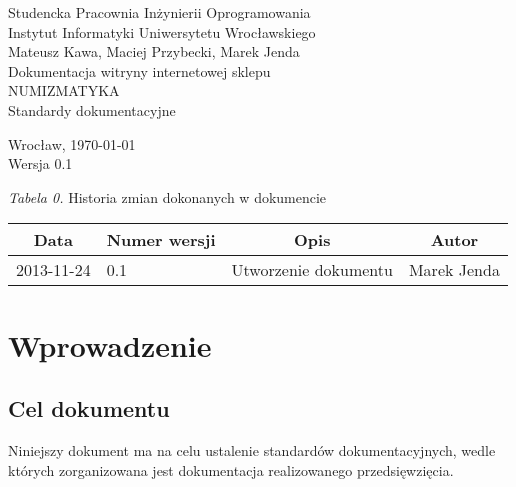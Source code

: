 \documentclass [11pt, a4paper, leqno]	{article}	%
\begin{document}

\begin{center}
	\thispagestyle{empty} 							%
	{\large Studencka Pracownia Inżynierii Oprogramowania} 		\\ [0.5cm]
	{\large Instytut Informatyki Uniwersytetu Wrocławskiego} 	\\ [6.0cm]

	{\large Mateusz Kawa, Maciej Przybecki, Marek Jenda} 		\\ [1.5cm]

	{\huge Dokumentacja witryny internetowej sklepu} 			\\ [0.5cm]
	{\huge NUMIZMATYKA} 										\\ [1.5cm]

	{\large Standardy dokumentacyjne} 							\\ [0.5cm]

	\vfill
	
	{\large Wrocław, \today}									\\ [0.5cm]
	{\large Wersja 0.1}
\end{center}

\newpage


\textit{Tabela 0.} Historia zmian dokonanych w dokumencie

\begin{center}
	\begin{tabular}{| l | l | l | l |}
		\hline
		\multicolumn{1}{|c|}{Data} & 
		\multicolumn{1}{|c|}{Numer wersji} &  
		\multicolumn{1}{|c|}{Opis} &
		\multicolumn{1}{|c|}{Autor} \\ \hline \hline
		2013-11-24 & 0.1 & Utworzenie dokumentu & Marek Jenda \\ \hline
	\end{tabular}
\end{center}

\newpage


\tableofcontents

\newpage

\section{Wprowadzenie}

\subsection{Cel dokumentu}
\noindent
Niniejszy dokument ma na celu ustalenie standardów dokumentacyjnych, wedle których zorganizowana jest dokumentacja realizowanego przedsięwzięcia.
\end{document}
